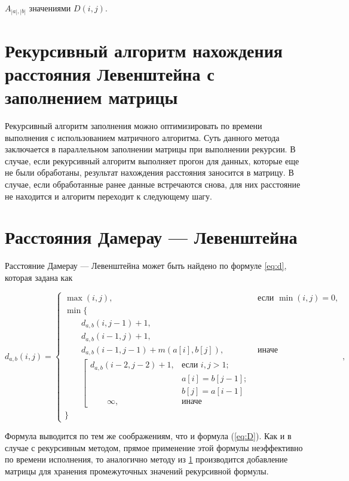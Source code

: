 \documentclass[12pt]{report}
\begin{document}
	$A_{|a|,|b|}$ значениями $D(i, j)$.
	
	
	\section{Рекурсивный алгоритм нахождения расстояния Левенштейна с заполнением матрицы}
	
	\label{sec:recmat}
	
	
	Рекурсивный алгоритм заполнения можно оптимизировать по времени выполнения с использованием матричного алгоритма. Суть данного метода заключается в параллельном заполнении матрицы при выполнении рекурсии. В случае, если рекурсивный алгоритм выполняет прогон для данных, которые еще не были обработаны, результат нахождения расстояния заносится в матрицу. В случае, если обработанные ранее данные встречаются снова, для них расстояние не находится и алгоритм переходит к следующему шагу.
	
	
	\section{Расстояния Дамерау — Левенштейна}
	
	Расстояние Дамерау — Левенштейна \cite{Damerau} может быть найдено по формуле \ref{eq:d}, которая задана как
	
	\begin{equation}
		\label{eq:d}
		d_{a,b}(i, j) = \begin{cases}
			\max(i, j), &\text{если }\min(i, j) = 0,\\
			\min \lbrace \\
			\qquad d_{a,b}(i, j-1) + 1,\\
			\qquad d_{a,b}(i-1, j) + 1,\\
			\qquad d_{a,b}(i-1, j-1) + m(a[i], b[j]), &\text{иначе}\\
			\qquad \left[ \begin{array}{cc}d_{a,b}(i-2, j-2) + 1, &\text{если }i,j > 1;\\
				\qquad &\text{}a[i] = b[j-1]; \\
				\qquad &\text{}b[j] = a[i-1]\\
				\qquad \infty, & \text{иначе}\end{array}\right.\\
			\rbrace
		\end{cases},
	\end{equation}
	
	Формула выводится по тем же соображениям, что и формула (\ref{eq:D}).
	Как и в случае с рекурсивным методом, прямое применение этой формулы неэффективно по времени исполнения, то аналогично методу из \ref{sec:recmat} производится добавление матрицы для хранения промежуточных значений рекурсивной формулы.
	
\end{document}
